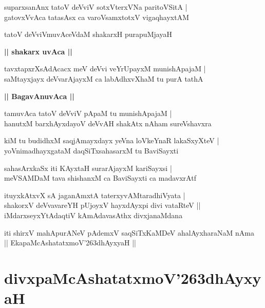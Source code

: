 \documentclass[twoside,12pt,openright]{book}
\def\S{\char'263}
\newcounter{shloka}[chapter]
\def\uvaca#1{\centerline{{\large\textbf{#1}}}}
\begin{document}
\begin{shloka}%
suparxsanAnx tatoV deVviV sotxVterxVNa paritoVSitA |\\
gatovxVvAca tatasAsx ca varoVsamxtotxV vigaqhayxtAM 
\end{shloka}

\begin{shloka}%
tatoV deVviVmuvAceVdaM shakarxH purapuMjayaH 
\end{shloka}

\uvaca{|| shakarx uvAca ||}

\begin{shloka}%
tavxtapxrXsAdAcacx meV deVvi veYrUpayxM munishApajaM |\\
saMtayxjayx deVvarAjayxM ca labAdhxvXhaM tu purA tathA 
\end{shloka}

\uvaca{|| BagavAnuvAca ||}

\begin{shloka}%
tamuvAca tatoV deVviV pApaM  tu munishApajaM |\\
hanutxM barxhAyxdayoV deVvAH shakAtx nAham sureVshavxra
\end{shloka}

\begin{shloka}%
kiM tu budidhxM saqjAmayxdayx yeVna loVkeYnaR lakaSxyXteV |\\
yoVnimadhayxgataM daqSiTxsahasarxM tu BaviSayxti 
\end{shloka}

\begin{shloka}%
sahasArxkaSx iti KAyxtaH surarAjayxM kariSayxsi |\\
meVSAMDaM tava shishanxM ca BaviSayxti ca madavxrAtf
\end{shloka}

\begin{shloka}%
ituyxkAtxvX sA jaganAmxtA taterxyvAMtaradhiVyata |\\
shakorxV deVvavareYH pUjoyxV hayxdAyxpi divi vataRteV ||\\
iMdarxseyxYtAdaqtiV kAmAdavasAthx divxjanaMdana
\end{shloka}

\begin{center}
iti shirxV mahApurANeV pAdemxV saqSiTxKaMDeV ahalAyxharaNaM nAma \\
|| EkapaMcAshatatxmoV\S dhAyxyaH ||
\end{center}

\chapter{divxpaMcAshatatxmoV\S dhAyxyaH}
\end{document}
